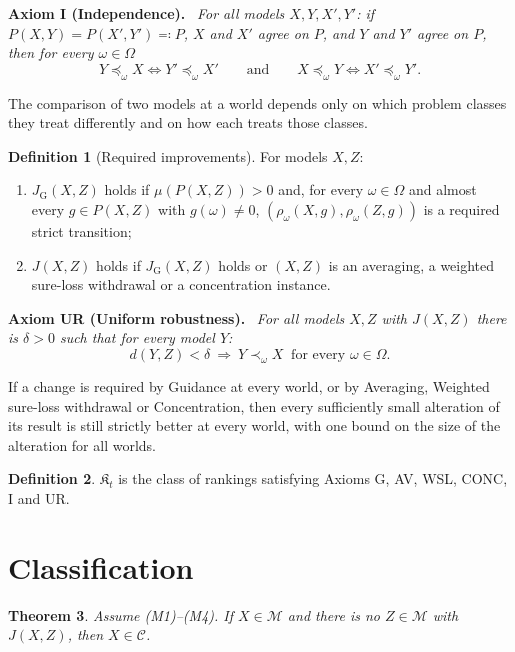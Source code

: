 \documentclass[11pt]{article}
\newtheorem{theorem}{Theorem}[section]
\theoremstyle{definition}
\newtheorem{definition}[theorem]{Definition}
\newenvironment{axiom}[1]{\par\medskip\noindent\textbf{Axiom #1.}\ \itshape}{\par\medskip}
\newcommand{\M}{\mathcal M}
\newcommand{\C}{\mathcal C}
\newcommand{\K}{\mathfrak K}
\newcommand{\GU}{\mathrm{G}}
\begin{document}
\begin{axiom}{I (Independence)}
For all models $X,Y,X',Y'$: if $P(X,Y)=P(X',Y')\eqqcolon P$, $X$ and $X'$ agree on $P$, and $Y$ and $Y'$ agree on $P$, then for every $\omega\in\Omega$
\[
Y\preceq_\omega X\iff Y'\preceq_\omega X'\qquad\text{and}\qquad X\preceq_\omega Y\iff X'\preceq_\omega Y'.
\]
\end{axiom}
\noindent The comparison of two models at a world depends only on which problem classes they treat differently and on how each treats those classes.

\begin{definition}[Required improvements]\label{def:J}
For models $X,Z$:
\begin{enumerate}[label=(\alph*)]
\item $J_\GU(X,Z)$ holds if $\mu(P(X,Z))>0$ and, for every $\omega\in\Omega$ and almost every $g\in P(X,Z)$ with $g(\omega)\ne0$, $(\rho_\omega(X,g),\rho_\omega(Z,g))$ is a required strict transition;
\item $J(X,Z)$ holds if $J_\GU(X,Z)$ holds or $(X,Z)$ is an averaging, a weighted sure-loss withdrawal or a concentration instance.
\end{enumerate}
\end{definition}

\begin{axiom}{UR (Uniform robustness)}
For all models $X,Z$ with $J(X,Z)$ there is $\delta>0$ such that for every model $Y$:
\[
d(Y,Z)<\delta\ \Longrightarrow\ Y\prec_\omega X\ \text{ for every }\omega\in\Omega.
\]
\end{axiom}
\noindent If a change is required by Guidance at every world, or by Averaging, Weighted sure-loss withdrawal or Concentration, then every sufficiently small alteration of its result is still strictly better at every world, with one bound on the size of the alteration for all worlds.

\begin{definition}\label{def:class}
$\K_t$ is the class of rankings satisfying Axioms G, AV, WSL, CONC, I and UR.
\end{definition}

\section{Classification}\label{sec:classification}

\begin{theorem}\label{thm:classification}
Assume (M1)--(M4). If $X\in\M$ and there is no $Z\in\M$ with $J(X,Z)$, then $X\in\C$.
\end{theorem}
\end{document}
